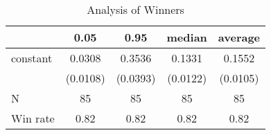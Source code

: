 \begin{table}
\caption{Analysis of Winners}
\begin{center}
\begin{tabular}{lcccc}
\hline
         &   0.05   &   0.95   &  median  & average   \\
\midrule
\midrule
constant & 0.0308   & 0.3536   & 0.1331   & 0.1552    \\
         & (0.0108) & (0.0393) & (0.0122) & (0.0105)  \\
N        & 85       & 85       & 85       & 85        \\
Win rate & 0.82     & 0.82     & 0.82     & 0.82      \\
\hline
\end{tabular}
\end{center}
\end{table}